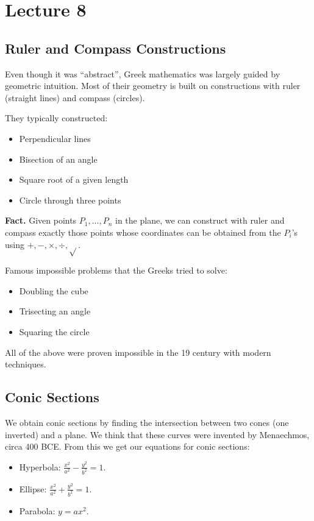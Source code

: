 \documentclass[class=article, crop=false]{standalone}
\begin{document}
  \section{Lecture 8}
  \subsection{Ruler and Compass Constructions}
  Even though it was ``abstract'', Greek mathematics was largely guided by geometric intuition. Most of their geometry is built on constructions with ruler (straight lines) and compass (circles). \par
  They typically constructed:
  \begin{itemize}
    \item Perpendicular lines
    \item Bisection of an angle
    \item Square root of a given length
    \item Circle through three points
  \end{itemize}
  \textbf{Fact.} Given points $P_1,\dotsc,P_n$ in the plane, we can construct with ruler and compass exactly those points whose coordinates can be obtained from the $P_i$'s using $+, -, \times, \div, \sqrt{}$. \par
  Famous impossible problems that the Greeks tried to solve:
  \begin{itemize}
    \item Doubling the cube
    \item Trisecting an angle
    \item Squaring the circle
  \end{itemize}
  All of the above were proven impossible in the 19 century with modern techniques.
  \subsection{Conic Sections}
  We obtain conic sections by finding the intersection between two cones (one inverted) and a plane. We think that these curves were invented by Menaechmos, circa 400 BCE. From this we get our equations for conic sections:
  \begin{itemize}
    \item Hyperbola: $\displaystyle \frac{x^2}{a^2} - \frac{y^2}{b^2} = 1$.
    \item Ellipse: $\displaystyle \frac{x^2}{a^2} + \frac{y^2}{b^2} = 1$.
    \item Parabola: $y = ax^2$.
  \end{itemize}
\end{document}

